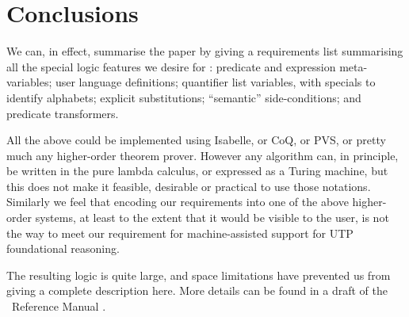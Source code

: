 \section{Conclusions}\label{sec:conclusions}


We can, in effect,
summarise the paper
 by giving a requirements list summarising all the special logic features we desire
 for :
predicate and expression meta-variables;
user language definitions;
quantifier list variables, with specials to identify alphabets;
explicit substitutions;
``semantic'' side-conditions;
and
predicate transformers.

All the above could be implemented using Isabelle, or CoQ,
or PVS, or pretty much any higher-order theorem prover.
However any algorithm can, in principle, be written in the pure lambda
calculus, or expressed as a Turing machine,
but this does not make it
feasible, desirable or practical to use those notations.
Similarly we feel that encoding our requirements into one of the above higher-order
systems, at least to the extent that it would be visible to the user,
is not the way to meet our requirement for machine-assisted support
for UTP foundational reasoning.

The resulting logic is quite large, and space limitations have prevented
us from giving a complete description here.
More details can be found in a draft of the \ Reference Manual
\cite{UTP2:Reference}.
